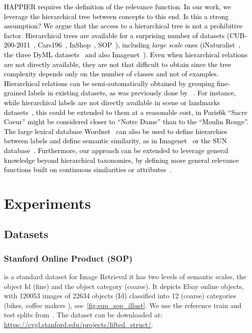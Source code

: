 \textcolor{black}{HAPPIER requires the definition of the relevance function. In our work, we leverage the hierarchical tree between concepts to this end. Is this a strong assumption? We argue that the access to a hierarchical tree is not a prohibitive factor. Hierarchical trees are available for a surprising number of datasets (CUB-200-2011~\cite{WahCUB_200_2011}, Cars196~\cite{cars196}, InShop~\cite{liuLQWTcvpr16DeepFashion}, SOP~\cite{oh2016deep}), including \emph{large scale} ones (iNaturalist~\cite{van2018inaturalist}, the three DyML datasets~\cite{sun2021dynamic} and also Imagenet~\cite{imagenet}). Even when hierarchical relations are not directly available, they are not that difficult to obtain since the tree complexity depends only on the number of classes and not of examples. Hierarchical relations can be semi-automatically obtained by grouping fine-grained labels in existing datasets, as was previously done by \eg~\cite{chang2021your}. For instance, while hierarchical labels are not directly available in scene or landmarks datasets~\cite{Radenovic-CVPR18}, this could be extended to them at a reasonable cost, \eg in Paris6k ``Sacre Coeur'' might be considered closer to ``Notre Dame'' than to the ``Moulin Rouge''. The large lexical database Wordnet~\cite{wordnet} can also be used to define hierarchies between labels and define semantic similarity, as in Imagenet~\cite{imagenet} or the SUN database~\cite{SUN}. Furthermore, our approach can be extended to leverage general knowledge beyond hierarchical taxonomies, by defining more general relevance functions built on \eg continuous similarities or attributes~\cite{parikh2011relative}.}


\section{Experiments}

\subsection{Datasets}


\subsubsection{Stanford Online Product (SOP)} \cite{oh2016deep} is a standard dataset for Image Retrieval it has two levels of semantic scales, the object Id (fine) and the object category (coarse). It depicts Ebay online objects, with \num{120053} images of \num{22634} objects (Id) classified into \num{12} (coarse) categories (\eg bikes, coffee makers \etc), see~\cref{fig:sup_sop_illust}. We use the reference train and test splits from~\cite{oh2016deep}. The dataset can be downloaded at: \url{https://cvgl.stanford.edu/projects/lifted_struct/}.

